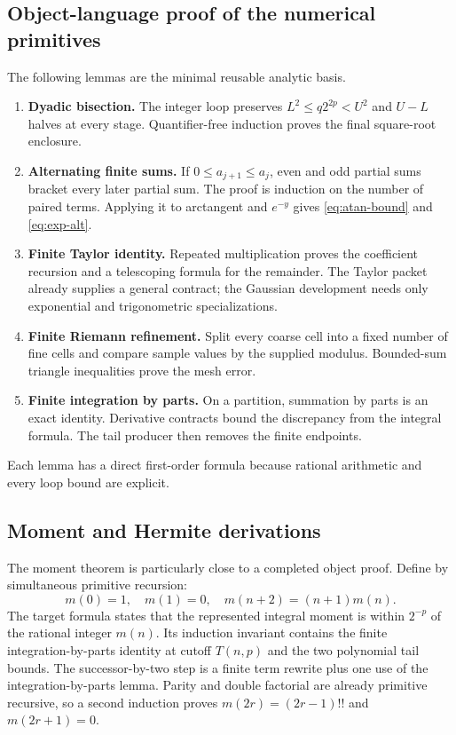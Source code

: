 \subsection{Object-language proof of the numerical primitives}

The following lemmas are the minimal reusable analytic basis.

\begin{enumerate}[label=\textbf{N\arabic*.}]
  \item \textbf{Dyadic bisection.}  The integer loop preserves
  $L^2\le q2^{2p}<U^2$ and $U-L$ halves at every stage.  Quantifier-free induction proves the final square-root enclosure.
  \item \textbf{Alternating finite sums.}  If $0\le a_{j+1}\le a_j$, even and odd partial sums bracket every later partial sum.  The proof is induction on the number of paired terms.  Applying it to arctangent and $e^{-y}$ gives \eqref{eq:atan-bound} and \eqref{eq:exp-alt}.
  \item \textbf{Finite Taylor identity.}  Repeated multiplication proves the coefficient recursion and a telescoping formula for the remainder.  The Taylor packet already supplies a general contract; the Gaussian development needs only exponential and trigonometric specializations.
  \item \textbf{Finite Riemann refinement.}  Split every coarse cell into a fixed number of fine cells and compare sample values by the supplied modulus.  Bounded-sum triangle inequalities prove the mesh error.
  \item \textbf{Finite integration by parts.}  On a partition, summation by parts is an exact identity.  Derivative contracts bound the discrepancy from the integral formula.  The tail producer then removes the finite endpoints.
\end{enumerate}

Each lemma has a direct first-order formula because rational arithmetic and every loop bound are explicit.

\subsection{Moment and Hermite derivations}

The moment theorem is particularly close to a completed object proof.  Define  by simultaneous primitive recursion:
\[
 m(0)=1,
 \quad m(1)=0,
 \quad m(n+2)=(n+1)m(n).
\]
The target formula states that the represented integral moment is within $2^{-p}$ of the rational integer $m(n)$.  Its induction invariant contains the finite integration-by-parts identity at cutoff $T(n,p)$ and the two polynomial tail bounds.  The successor-by-two step is a finite term rewrite plus one use of the integration-by-parts lemma.  Parity and double factorial are already primitive recursive, so a second induction proves
$m(2r)=(2r-1)!!$ and $m(2r+1)=0$.

